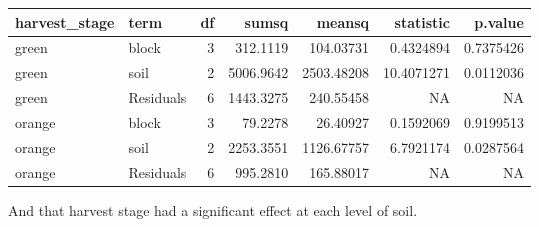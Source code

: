 \documentclass[
]{book}
\newenvironment{Shaded}{\begin{snugshade}}{\end{snugshade}}
\newcommand{\AttributeTok}[1]{\textcolor[rgb]{0.77,0.63,0.00}{#1}}
\newcommand{\FunctionTok}[1]{\textcolor[rgb]{0.00,0.00,0.00}{#1}}
\newcommand{\NormalTok}[1]{#1}
\newcommand{\OtherTok}[1]{\textcolor[rgb]{0.56,0.35,0.01}{#1}}
\newcommand{\SpecialCharTok}[1]{\textcolor[rgb]{0.00,0.00,0.00}{#1}}
\newcommand{\StringTok}[1]{\textcolor[rgb]{0.31,0.60,0.02}{#1}}
\begin{document}
\begin{tabular}{l|l|r|r|r|r|r}
\hline
harvest\_stage & term & df & sumsq & meansq & statistic & p.value\\
\hline
green & block & 3 & 312.1119 & 104.03731 & 0.4324894 & 0.7375426\\
\hline
green & soil & 2 & 5006.9642 & 2503.48208 & 10.4071271 & 0.0112036\\
\hline
green & Residuals & 6 & 1443.3275 & 240.55458 & NA & NA\\
\hline
orange & block & 3 & 79.2278 & 26.40927 & 0.1592069 & 0.9199513\\
\hline
orange & soil & 2 & 2253.3551 & 1126.67757 & 6.7921174 & 0.0287564\\
\hline
orange & Residuals & 6 & 995.2810 & 165.88017 & NA & NA\\
\hline
\end{tabular}

And that harvest stage had a significant effect at each level of soil.

\begin{Shaded}
\end{Shaded}
\end{document}
